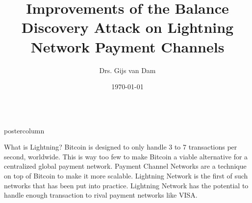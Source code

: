 \documentclass{beamer}
\title{Improvements of the Balance Discovery Attack on Lightning Network Payment Channels}
\author{Drs. Gijs van Dam}
\institute{Institute of Visual Informatics}
\date{\today}
\newlength{\columnheight}
\begin{document}
  \begin{frame}
    \begin{columns}
      \begin{column}{.5\textwidth}
        \begin{beamercolorbox}[center]{postercolumn}
          \begin{minipage}{.98\textwidth}  %
            \parbox[t][\columnheight]{\textwidth}{ %
              \begin{myblock}{What is Lightning?}
                Bitcoin is designed to only handle 3 to 7 transactions per second, worldwide. This is way too few to make Bitcoin a viable alternative for a centralized global payment network. Payment Channel Networks are a technique on top of Bitcoin to make it more scalable. Lightning Network \cite{Poon2016} is the first of such networks that has been put into practice. Lightning Network has the potential to handle enough transaction to rival payment networks like VISA.
                \begin{figure}
                  \begin{minipage}{0.94\textwidth}
                    \centering
\end{minipage}
\end{figure}
\end{myblock}}
\end{minipage}
\end{beamercolorbox}
\end{column}
\end{columns}
\end{frame}
\end{document}
